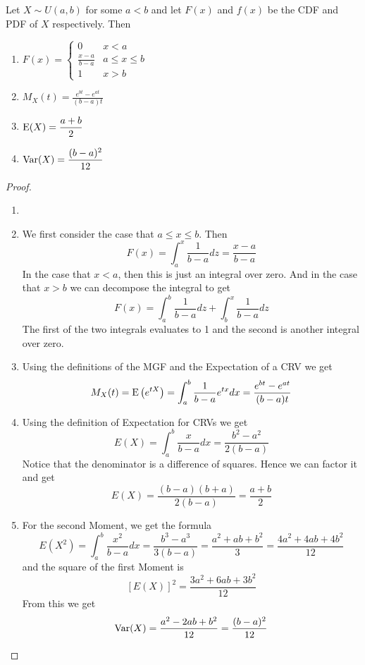 \documentclass{report}
\begin{document}
\begin{theorem}
    Let $X\sim U(a,b)$ for some $a<b$ and let $F(x)$ and $f(x)$ be the CDF and PDF of $X$ respectively. Then
    \begin{enumerate}
        \item $F(x) = \begin{cases}
            0 & x < a\\
            \displaystyle\frac{x-a}{b-a} & a\le x \le b\\
            1 & x>b
        \end{cases}$
        \item $M_X(t)=\displaystyle\frac{e^{bt}-e^{at}}{(b-a)t}$
        \item $\textup{E}(X)=\displaystyle\frac{a+b} 2$
        \item $\textup{Var}(X)=\displaystyle\frac{(b-a)^2}{12}$
    \end{enumerate}
    \begin{proof}
        \begin{enumerate}
            \item[]
            \item We first consider the case that $a\le x\le b$. Then
            \[
                F(x)=\int_a^x \frac 1 {b-a} dz = \frac{x-a}{b-a}
            \]
            In the case that $x<a$, then this is just an integral over zero. And in the case that $x>b$ we can decompose the integral to get
            \[
                F(x)=\int_a^b \frac 1 {b-a} dz + \int_b^x \frac 1 {b-a} dz
            \]
            The first of the two integrals evaluates to 1 and the second is another integral over zero.
            \item Using the definitions of the MGF and the Expectation of a CRV we get
            \[
                M_X(t)=\textup{E}\left(e^{tX}\right)=\int_a^b \frac 1 {b-a} e^{tx} dx=\frac{e^{bt}-e^{at}}{(b-a)t}
            \]
            \item Using the definition of Expectation for CRVs we get
            \[
                E(X)=\int_a^b \frac x {b-a} dx=\frac{b^2-a^2}{2(b-a)}
            \]
            Notice that the denominator is a difference of squares. Hence we can factor it and get
            \[
                E(X)=\frac{(b-a)(b+a)}{2(b-a)}=\frac{a+b} 2
            \]
            \item For the second Moment, we get the formula
            \[
                E(X^2)=\int_a^b \frac {x^2} {b-a} dx=\frac{b^3-a^3}{3(b-a)}=\frac{a^2+ab+b^2} 3 = \frac{4a^2+4ab+4b^2}{12}
            \]
            and the square of the first Moment is 
            \[
                [E(X)]^2 = \frac{3a^2+6ab+3b^2}{12}
            \]
            From this we get
            \[
                \textup{Var}(X)=\frac{a^2-2ab+b^2} {12}= \frac{(b-a)^2} {12}
            \]
        \end{enumerate}
    \end{proof}
\end{theorem}
\end{document}
